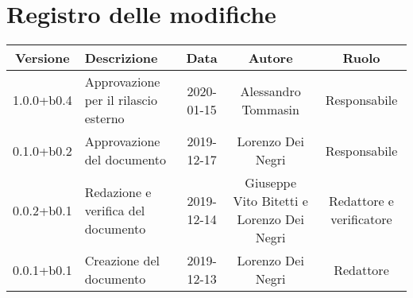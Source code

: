 \section*{Registro delle modifiche}

\begin{center}
	\begin{longtable}{|c|p{3cm}|c|c|c|}
	\hline
	\rowcolor{lighter-grayer}
	\textbf{Versione} & \textbf{Descrizione} & \textbf{Data} & \textbf{Autore} & \textbf{Ruolo} \\
	\hline
	\endfirsthead


	1.0.0+b0.4 & Approvazione per il rilascio esterno & 2020-01-15 & Alessandro Tommasin & Responsabile \\
	\hline
	0.1.0+b0.2 & Approvazione del documento & 2019-12-17 & Lorenzo Dei Negri & Responsabile \\
	\hline
	0.0.2+b0.1 & Redazione e verifica del documento & 2019-12-14 & Giuseppe Vito Bitetti e Lorenzo Dei Negri & Redattore e verificatore \\
	\hline
	0.0.1+b0.1 & Creazione del documento & 2019-12-13 & Lorenzo Dei Negri & Redattore \\
	\hline

	\end{longtable}
\end{center}
